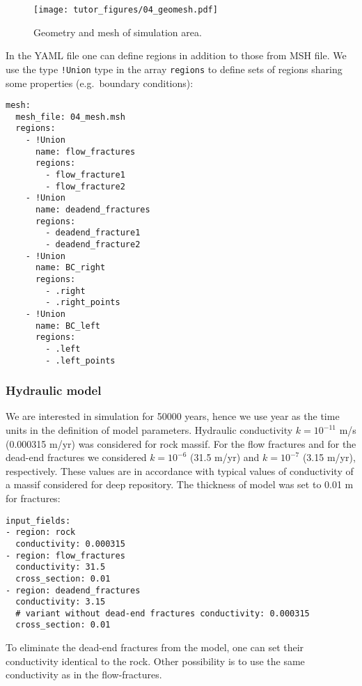 \begin{figure}
\hypertarget{fig:mesh}{%
\centering
\texttt{[image: tutor\_figures/04\_geomesh.pdf]}
\caption{Geometry and mesh of simulation area.}\label{fig:mesh}
}
\end{figure}

In the YAML file one can define regions in addition to those from MSH
file. We use the type \texttt{!Union} type in the array \texttt{regions}
to define sets of regions sharing some properties (e.g.~boundary
conditions):

\begin{verbatim}
mesh:
  mesh_file: 04_mesh.msh
  regions:
    - !Union
      name: flow_fractures
      regions:
        - flow_fracture1
        - flow_fracture2
    - !Union
      name: deadend_fractures
      regions:
        - deadend_fracture1
        - deadend_fracture2
    - !Union
      name: BC_right
      regions:
        - .right
        - .right_points
    - !Union
      name: BC_left
      regions:
        - .left
        - .left_points
\end{verbatim}

\subsubsection{Hydraulic model}

We are interested in simulation for 50000 years, hence we use year as
the time units in the definition of model parameters. Hydraulic
conductivity \(k = 10^{-11}\) m/s (0.000315 m/yr) was considered for
rock massif. For the flow fractures and for the dead-end fractures we
considered \(k = 10^{-6}\) (31.5 m/yr) and \(k = 10^{-7}\) (3.15 m/yr),
respectively. These values are in accordance with typical values of
conductivity of a massif considered for deep repository. The thickness
of model was set to 0.01 m for fractures:

\begin{verbatim}
input_fields:
- region: rock
  conductivity: 0.000315
- region: flow_fractures
  conductivity: 31.5
  cross_section: 0.01
- region: deadend_fractures
  conductivity: 3.15
  # variant without dead-end fractures conductivity: 0.000315
  cross_section: 0.01
\end{verbatim}

To eliminate the dead-end fractures from the model, one can set their
conductivity identical to the rock. Other possibility is to use the same
conductivity as in the flow-fractures.

